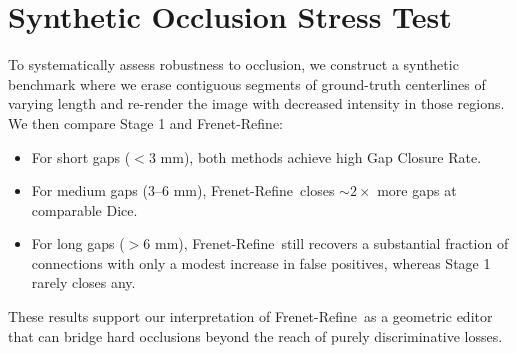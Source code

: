 \documentclass{article}
\newcommand{\modelname}{Frenet-Refine}
\begin{document}
\section{Synthetic Occlusion Stress Test}
\label{sec:appendix_stress}

To systematically assess robustness to occlusion, we construct a synthetic benchmark where we erase contiguous segments of ground-truth centerlines of varying length and re-render the image with decreased intensity in those regions. We then compare Stage 1 and \modelname:

\begin{itemize}[leftmargin=*]
  \item For short gaps ($< 3$ mm), both methods achieve high Gap Closure Rate.
  \item For medium gaps ($3$--$6$ mm), \modelname\ closes $\sim 2\times$ more gaps at comparable Dice.
  \item For long gaps ($> 6$ mm), \modelname\ still recovers a substantial fraction of connections with only a modest increase in false positives, whereas Stage 1 rarely closes any.
\end{itemize}

These results support our interpretation of \modelname\ as a geometric editor that can bridge hard occlusions beyond the reach of purely discriminative losses.





\end{document}
